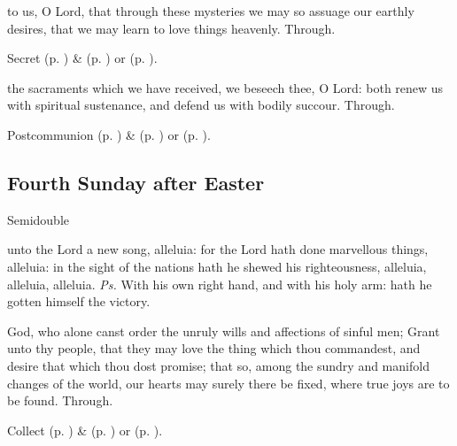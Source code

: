 
\clearpage
\secret
{} to us, O Lord, that through these mysteries we may so assuage our earthly desires, that we may learn to love things heavenly. Through.


\begin{rubric}
     Secret  (p. \pageref{SPMaryInEaster}) \&   (p. \pageref{SPAgainst}) or  (p. \pageref{SPChiefBishop}).
\end{rubric}


\postcommunion
{} the sacraments which we have received, we beseech thee, O Lord: both renew us with spiritual sustenance, and defend us with bodily succour. Through.
\begin{rubric}
     Postcommunion  (p. \pageref{SPMaryInEaster}) \&   (p. \pageref{SPAgainst}) or  (p. \pageref{SPChiefBishop}).
\end{rubric}


\subsection{Fourth Sunday after Easter}
\begin{inhead}
    {Semidouble}
\end{inhead}


\introit
{} unto the Lord a new song, alleluia: for the Lord hath done marvellous things, alleluia: in the sight of the nations hath he shewed his righteousness, alleluia, alleluia, alleluia. \textit{Ps.} With his own right hand, and with his holy arm: hath he gotten himself the victory.

\collect
{} God, who alone canst order the unruly wills and affections of sinful men; Grant unto thy people, that they may love the thing which thou commandest, and desire that which thou dost promise; that so, among the sundry and manifold changes of the world, our hearts may surely there be fixed, where true joys are to be found. Through.
\begin{rubric}
     Collect  (p. \pageref{SPMaryInEaster}) \&   (p. \pageref{SPAgainst}) or  (p. \pageref{SPChiefBishop}).
\end{rubric}


